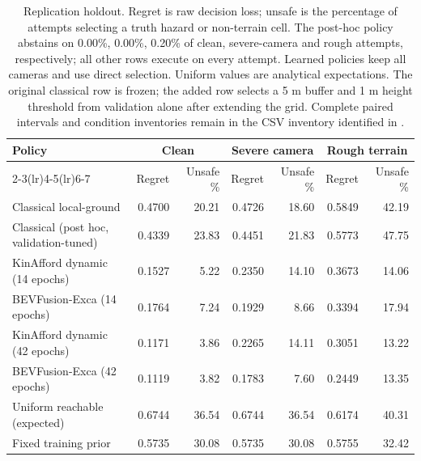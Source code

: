 \begin{table}[H]\centering\scriptsize\setlength{\tabcolsep}{4pt}
\caption{Replication holdout. Regret is raw decision loss; unsafe is the percentage of attempts selecting a truth hazard or non-terrain cell. The post-hoc policy abstains on 0.00\%, 0.00\%, 0.20\% of clean, severe-camera and rough attempts, respectively; all other rows execute on every attempt. Learned policies keep all cameras and use direct selection. Uniform values are analytical expectations. The original classical row is frozen; the added row selects a 5 m buffer and 1 m height threshold from validation alone after extending the grid. Complete paired intervals and condition inventories remain in the CSV inventory identified in \artifactsection.}\label{tab:taskvaluereplication}
\begin{tabular}{lrrrrrr}\toprule
Policy & \multicolumn{2}{c}{Clean} & \multicolumn{2}{c}{Severe camera} & \multicolumn{2}{c}{Rough terrain}\\
\cmidrule(lr){2-3}\cmidrule(lr){4-5}\cmidrule(lr){6-7}
 & Regret & Unsafe \% & Regret & Unsafe \% & Regret & Unsafe \%\\\midrule
Classical local-ground & 0.4700 & 20.21 & 0.4726 & 18.60 & 0.5849 & 42.19\\
Classical (post hoc, validation-tuned) & 0.4339 & 23.83 & 0.4451 & 21.83 & 0.5773 & 47.75\\
KinAfford dynamic (14 epochs) & 0.1527 & 5.22 & 0.2350 & 14.10 & 0.3673 & 14.06\\
BEVFusion-Exca (14 epochs) & 0.1764 & 7.24 & 0.1929 & 8.66 & 0.3394 & 17.94\\
KinAfford dynamic (42 epochs) & 0.1171 & 3.86 & 0.2265 & 14.11 & 0.3051 & 13.22\\
BEVFusion-Exca (42 epochs) & 0.1119 & 3.82 & 0.1783 & 7.60 & 0.2449 & 13.35\\
Uniform reachable (expected) & 0.6744 & 36.54 & 0.6744 & 36.54 & 0.6174 & 40.31\\
Fixed training prior & 0.5735 & 30.08 & 0.5735 & 30.08 & 0.5755 & 32.42\\
\bottomrule\end{tabular}\end{table}
